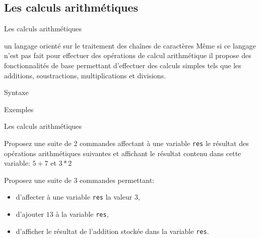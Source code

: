 \subsection{Les calculs arithmétiques}
\begin{frame}{Les calculs arithmétiques}
  \begin{alertblock}{ un langage orienté sur le traitement des chaînes de caractères}
    Même si ce langage n'est pas fait pour effectuer des opérations de calcul arithmétique il propose des fonctionnalités de base permettant d'effectuer des calculs simples tels que les additions, soustractions, multiplications et divisions. 
  \end{alertblock}
  \begin{block}{Syntaxe}
    \begin{center}
    \end{center}
  \end{block}
  \begin{block}{Exemples}
    \begin{center}
      \tiny{%
      }
    \end{center}
  \end{block}
\end{frame}

\begin{exercice}
  \begin{exercicelet}{Les calculs arithmétiques}
    \begin{questions}
    \item Proposez une suite de 2 commandes affectant à une variable \texttt{res} le résultat des opérations arithmétiques suivantes et affichant le résultat contenu dans cette variable: $5 + 7$ et $3 * 2$
    \item Proposez une suite de 3 commandes permettant:
      \begin{itemize}
      \item d'affecter à une variable \texttt{res} la valeur $3$,
      \item d'ajouter $13$ à la variable \texttt{res},
      \item d'afficher le résultat de l'addition stockée dans la variable \texttt{res}.
      \end{itemize}


    \end{questions}
  \end{exercicelet}
\end{exercice}

